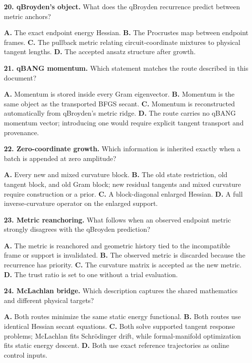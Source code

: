 \documentclass[10pt,twocolumn]{article}
\begin{document}
\textbf{20. qBroyden's object.}
What does the qBroyden recurrence predict between metric anchors?

\textbf{A.} The exact endpoint energy Hessian.\quad
\textbf{B.} The Procrustes map between endpoint frames.\quad
\textbf{C.} The pullback metric relating circuit-coordinate mixtures to
physical tangent lengths.\quad
\textbf{D.} The accepted ansatz structure after growth.

\textbf{21. qBANG momentum.}
Which statement matches the route described in this document?

\textbf{A.} Momentum is stored inside every Gram eigenvector.\quad
\textbf{B.} Momentum is the same object as the transported BFGS secant.\quad
\textbf{C.} Momentum is reconstructed automatically from qBroyden's metric
ridge.\quad
\textbf{D.} The route carries no qBANG momentum vector; introducing one would
require explicit tangent transport and provenance.

\textbf{22. Zero-coordinate growth.}
Which information is inherited exactly when a batch is appended at zero
amplitude?

\textbf{A.} Every new and mixed curvature block.\quad
\textbf{B.} The old state restriction, old tangent block, and old Gram block;
new residual tangents and mixed curvature require construction or a prior.\quad
\textbf{C.} A block-diagonal enlarged Hessian.\quad
\textbf{D.} A full inverse-curvature operator on the enlarged support.

\textbf{23. Metric reanchoring.}
What follows when an observed endpoint metric strongly disagrees with the
qBroyden prediction?

\textbf{A.} The metric is reanchored and geometric history tied to the
incompatible frame or support is invalidated.\quad
\textbf{B.} The observed metric is discarded because the recurrence has
priority.\quad
\textbf{C.} The curvature matrix is accepted as the new metric.\quad
\textbf{D.} The trust ratio is set to one without a trial evaluation.

\textbf{24. McLachlan bridge.}
Which description captures the shared mathematics and different physical
targets?

\textbf{A.} Both routes minimize the same static energy functional.\quad
\textbf{B.} Both routes use identical Hessian secant equations.\quad
\textbf{C.} Both solve supported tangent response problems; McLachlan fits
Schr\"odinger drift, while formal-manifold optimization fits static energy
descent.\quad
\textbf{D.} Both use exact reference trajectories as online control inputs.
\end{document}
